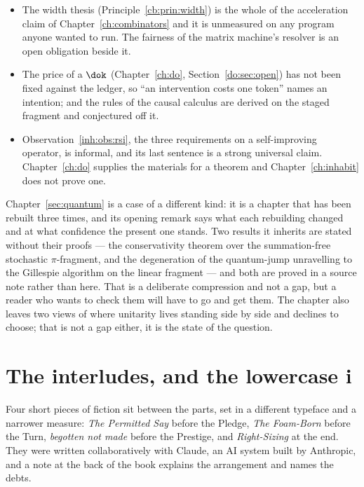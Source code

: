 \begin{itemize}[leftmargin=1.6em, itemsep=4pt]
      covers a fragment --- no joins, no patterns --- of what the
      store implements.
\item The width thesis (Principle~\ref{cb:prin:width}) is the
      whole of the acceleration claim of Chapter~\ref{ch:combinators}
      and it is unmeasured on any program anyone wanted to run.
      The fairness of the matrix machine's resolver is an open
      obligation beside it.
\item The price of a $\dok$ (Chapter~\ref{ch:do},
      Section~\ref{do:sec:open}) has not been fixed against the
      ledger, so ``an intervention costs one token'' names an
      intention; and the rules of the causal calculus are derived on
      the staged fragment and conjectured off it.
\item Observation~\ref{inh:obs:rsi}, the three requirements on a
      self-improving operator, is informal, and its last sentence is
      a strong universal claim.
      Chapter~\ref{ch:do} supplies the materials for a theorem and
      Chapter~\ref{ch:inhabit} does not prove one.
\end{itemize}

\noindent
Chapter~\ref{sec:quantum} is a case of a different kind: it is a
chapter that has been rebuilt three times, and its opening remark
says what each rebuilding changed and at what confidence the present
one stands.
Two results it inherits are stated without their proofs --- the
conservativity theorem over the summation-free stochastic
$\pi$-fragment, and the degeneration of the quantum-jump unravelling
to the Gillespie algorithm on the linear fragment --- and both are
proved in a source note rather than here.
That is a deliberate compression and not a gap, but a reader who
wants to check them will have to go and get them.
The chapter also leaves two views of where unitarity lives standing
side by side and declines to choose; that is not a gap either, it is
the state of the question.

\section*{The interludes, and the lowercase i}

Four short pieces of fiction sit between the parts, set in a
different typeface and a narrower measure: \emph{The Permitted Say}
before the Pledge, \emph{The Foam-Born} before the Turn,
\emph{begotten not made} before the Prestige, and
\emph{Right-Sizing} at the end.
They were written collaboratively with Claude, an AI system built
by Anthropic, and a note at the back of the book explains the
arrangement and names the debts.

